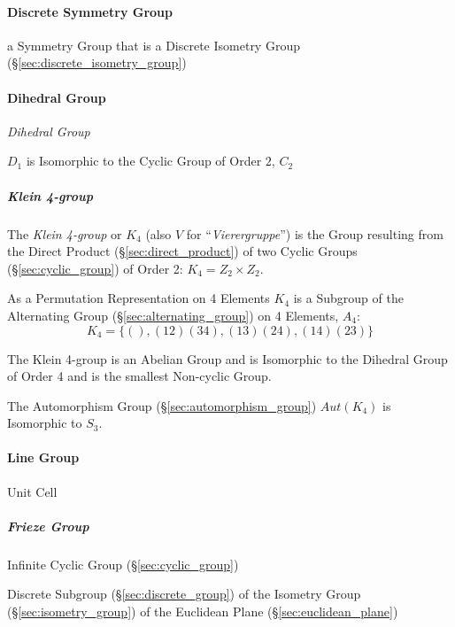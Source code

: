 \paragraph{Discrete Symmetry Group}\label{sec:discrete_symmetry_group}\hfill

a Symmetry Group that is a Discrete Isometry Group
(\S\ref{sec:discrete_isometry_group})



\paragraph{Dihedral Group}\label{sec:dihedral_group}\hfill

\emph{Dihedral Group}

$D_1$ is Isomorphic to the Cyclic Group of Order $2$, $C_2$



\subparagraph{Klein 4-group}\label{sec:klein_4group}\hfill

The \emph{Klein 4-group} or $K_4$ (also $V$ for
``\emph{Vierergruppe}'') is the Group resulting from the Direct
Product (\S\ref{sec:direct_product}) of two Cyclic Groups
(\S\ref{sec:cyclic_group}) of Order 2: $K_4 = Z_2 \times Z_2$.

As a Permutation Representation on 4 Elements $K_4$ is a Subgroup of
the Alternating Group (\S\ref{sec:alternating_group}) on 4 Elements,
$A_4$:
\[
    K_4 = \{ (), (12)(34), (13)(24), (14)(23) \}
\]

The Klein 4-group is an Abelian Group and is Isomorphic to the
Dihedral Group of Order 4 and is the smallest Non-cyclic Group.

The Automorphism Group (\S\ref{sec:automorphism_group}) $Aut(K_4)$ is
Isomorphic to $S_3$.



\paragraph{Line Group}\label{sec:line_group}\hfill

Unit Cell



\subparagraph{Frieze Group}\label{sec:frieze_group}\hfill

Infinite Cyclic Group (\S\ref{sec:cyclic_group})

Discrete Subgroup (\S\ref{sec:discrete_group}) of the Isometry Group
(\S\ref{sec:isometry_group}) of the Euclidean Plane
(\S\ref{sec:euclidean_plane})



